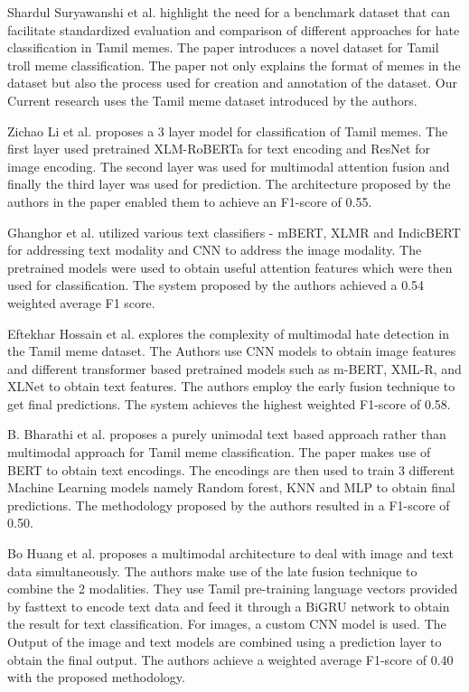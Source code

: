 \documentclass{ieeeaccess}
\begin{document}
Shardul Suryawanshi et al. \cite{b3} highlight the need for a benchmark dataset that can facilitate standardized evaluation and comparison of different approaches for hate classification in Tamil memes. The paper introduces a novel dataset for Tamil troll meme classification. The paper not only explains the format of memes in the dataset but also the process used for creation and annotation of the dataset. Our Current research uses the Tamil meme dataset introduced by the authors.

Zichao Li et al. \cite{b4} proposes a 3 layer model for classification of Tamil memes. The first layer used pretrained XLM-RoBERTa for text encoding and ResNet for image encoding. The second layer was used for multimodal attention fusion and finally the third layer was used for prediction. The architecture proposed by the authors in the paper enabled them to achieve an F1-score of 0.55.

Ghanghor et al. \cite{b5} utilized various text classifiers - mBERT, XLMR and IndicBERT for addressing text modality and CNN to address the image modality. The pretrained models were used to obtain useful attention features which were then used for classification. The system proposed by the authors achieved a 0.54 weighted average F1 score.

Eftekhar Hossain et al. \cite{b6} explores the complexity of multimodal hate detection in the Tamil meme dataset. The Authors use CNN models to obtain image features and different transformer based pretrained models such as m-BERT, XML-R, and XLNet to obtain text features. The authors employ the early fusion technique to get final predictions. The system achieves the highest weighted F1-score of 0.58.

B. Bharathi et al. \cite{b7} proposes a purely unimodal text based approach rather than multimodal approach for Tamil meme classification. The paper makes use of BERT to obtain text encodings. The encodings are then used to train 3 different Machine Learning models namely Random forest, KNN and MLP to obtain final predictions. The methodology proposed by the authors resulted in a F1-score of 0.50.

Bo Huang et al. \cite{b8} proposes a multimodal architecture to deal with image and text data simultaneously. The authors make use of the late fusion technique to combine the 2 modalities. They use Tamil pre-training language vectors provided by fasttext to encode text data and feed it through a BiGRU network to obtain the result for text classification. For images, a custom CNN model is used. The Output of the image and text models are combined using a prediction layer to obtain the final output. The authors achieve a weighted average F1-score of 0.40 with the proposed methodology.
\end{document}
